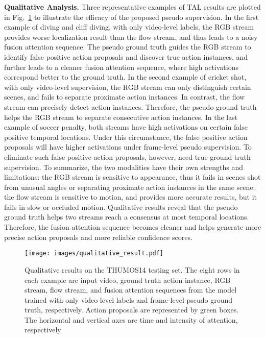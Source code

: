 \documentclass[runningheads]{llncs}
\begin{document}
\noindent\textbf{Qualitative Analysis.} Three representative examples of TAL results are plotted in Fig.~\ref{fig:qualitativeResult} to illustrate the efficacy of the proposed pseudo supervision. 
In the first example of diving and cliff diving, with only video-level labels, the RGB stream provides worse localization result than the flow stream, and thus leads to a noisy fusion attention sequence. The pseudo ground truth guides the RGB stream to identify false positive action proposals and discover true action instances, and further leads to a cleaner fusion attention sequence, where high activations correspond better to the ground truth.
In the second example of cricket shot, with only video-level supervision, the RGB stream can only distinguish certain scenes, and fails to separate proximate action instances. In contrast, the flow stream can precisely detect action instances. Therefore, the pseudo ground truth helps the RGB stream to separate consecutive action instances.
In the last example of soccer penalty, both streams have high activations on certain false positive temporal locations. Under this circumstance, the false positive action proposals will have higher activations under frame-level pseudo supervision. To eliminate such false positive action proposals, however, need true ground truth supervision.
To summarize, the two modalities have their own strengths and limitations: the RGB stream is sensitive to appearance, thus it fails in scenes shot from unusual angles or separating proximate action instances in the same scene; the flow stream is sensitive to motion, and provides more accurate results, but it fails in slow or occluded motion.
Qualitative results reveal that the pseudo ground truth helps two streams reach a consensus at most temporal locations. 
Therefore, the fusion attention sequence becomes cleaner and helps generate more precise action proposals and more reliable confidence scores.

\begin{figure}[t]
	\centering
	\texttt{[image: images/qualitative\_result.pdf]}
	\caption{Qualitative results on the THUMOS14 testing set. The eight rows in each example are input video, ground truth action instance, RGB stream, flow stream, and fusion attention sequences from the model trained with only video-level labels and frame-level pseudo ground truth, respectively. Action proposals are represented by green boxes. The horizontal and vertical axes are time and intensity of attention, respectively}
	\label{fig:qualitativeResult}
\end{figure}
\end{document}
